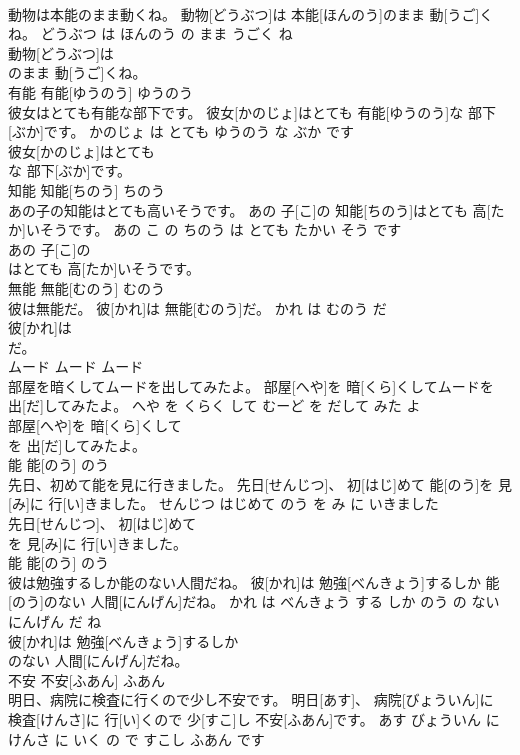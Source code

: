 \documentclass[8pt]{extreport}
\begin{document}
\begin{CJK}{UTF8}{min}
\\	動物は本能のまま動くね。	動物[どうぶつ]は 本能[ほんのう]のまま 動[うご]くね。	どうぶつ は ほんのう の まま うごく ね	
\\	動物[どうぶつ]は
\\	のまま 動[うご]くね。			
\\	有能	有能[ゆうのう]	ゆうのう	
\\	彼女はとても有能な部下です。	彼女[かのじょ]はとても 有能[ゆうのう]な 部下[ぶか]です。	かのじょ は とても ゆうのう な ぶか です	
\\	彼女[かのじょ]はとても
\\	な 部下[ぶか]です。			
\\	知能	知能[ちのう]	ちのう	
\\	あの子の知能はとても高いそうです。	あの 子[こ]の 知能[ちのう]はとても 高[たか]いそうです。	あの こ の ちのう は とても たかい そう です	
\\	あの 子[こ]の
\\	はとても 高[たか]いそうです。			
\\	無能	無能[むのう]	むのう	
\\	彼は無能だ。	彼[かれ]は 無能[むのう]だ。	かれ は むのう だ	
\\	彼[かれ]は
\\	だ。			
\\	ムード	ムード	ムード	
\\	部屋を暗くしてムードを出してみたよ。	部屋[へや]を 暗[くら]くしてムードを 出[だ]してみたよ。	へや を くらく して むーど を だして みた よ	
\\	部屋[へや]を 暗[くら]くして
\\	を 出[だ]してみたよ。			
\\	能	能[のう]	のう	
\\	先日、初めて能を見に行きました。	先日[せんじつ]、 初[はじ]めて 能[のう]を 見[み]に 行[い]きました。	せんじつ はじめて のう を み に いきました	
\\	先日[せんじつ]、 初[はじ]めて
\\	を 見[み]に 行[い]きました。			
\\	能	能[のう]	のう	
\\	彼は勉強するしか能のない人間だね。	彼[かれ]は 勉強[べんきょう]するしか 能[のう]のない 人間[にんげん]だね。	かれ は べんきょう する しか のう の ない にんげん だ ね	
\\	彼[かれ]は 勉強[べんきょう]するしか
\\	のない 人間[にんげん]だね。			
\\	不安	不安[ふあん]	ふあん	
\\	明日、病院に検査に行くので少し不安です。	明日[あす]、 病院[びょういん]に 検査[けんさ]に 行[い]くので 少[すこ]し 不安[ふあん]です。	あす びょういん に けんさ に いく の で すこし ふあん です	

\end{CJK}
\end{document}

